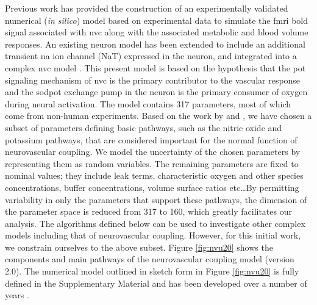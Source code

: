 Previous work \cite{Mathias2018} has provided  the construction of an experimentally validated numerical (\textit{in silico}) model based on experimental data to simulate the \gls{fmri} \gls{bold} signal associated with \gls{nvc} along with the associated metabolic and blood volume responses. An existing neuron model \citep{Mathias2017, Mathias2017a} has been extended to include an additional transient \gls{na} ion channel (NaT) expressed in the neuron, and integrated into a complex \gls{nvc} model \citep{Dormanns2015, Dormanns2016b, Kenny2017a}. This present model is based on the hypothesis that the \gls{pot} signaling mechanism of \gls{nvc} is the primary contributor to the vascular response and the \gls{sodpot} exchange pump in the neuron is the primary consumer of oxygen during neural activation. The model contains 317 parameters, most of which come from non-human experiments. Based on the work by \cite{Dormanns2016b} and \cite{Kenny2018}, we have chosen a subset of parameters defining basic pathways, such as  the nitric oxide and potassium pathways,   that are considered important for the normal function of neurovascular coupling.  We model the uncertainty of the chosen parameters  by representing them as random variables. The remaining  parameters are fixed to nominal values; they include leak terms, characteristic oxygen and other species concentrations, buffer concentrations, volume surface ratios etc\dots By permitting variability in only the parameters that support these pathways, the dimension of the parameter space is reduced from 317 to 160, which greatly facilitates our analysis. The algorithms defined below can be used to investigate other complex models including that of neurovascular coupling. However, for this initial work, we constrain ourselves to the above subset. 
Figure \ref{fig:nvu20} shows the components and main pathways of the neurovascular coupling model (version 2.0). The numerical model outlined in sketch form in Figure \ref{fig:nvu20} is fully defined in the Supplementary Material  and has been developed over a number of years \cite{Farr2011,Dormanns2015,Dormanns2016b}. 


